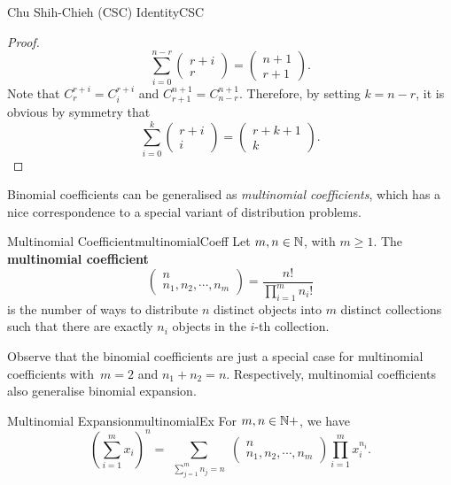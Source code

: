 \documentclass[math]{amznotes}
\theoremstyle{remark}
\newcommand{\0}{\mathbf{0}}
\newcommand{\1}{\mathbf{1}}
\begin{document}
\begin{thmbox}{Chu Shih-Chieh (CSC) Identity}{CSC}
\begin{proof}
        \begin{equation*}
            \sum_{i = 0}^{n - r}\begin{pmatrix}
                r + i \\
                r
            \end{pmatrix} = \begin{pmatrix}
                n + 1 \\
                r + 1
            \end{pmatrix}.
        \end{equation*}
        Note that $C^{r + i}_r = C^{r + i}_i$ and $C^{n + 1}_{r + 1} = C^{n + 1}_{n - r}$. Therefore, by setting $k = n - r$, it is obvious by symmetry that
        \begin{equation*}
            \sum_{i = 0}^{k}\begin{pmatrix}
                r + i \\
                i
            \end{pmatrix} = \begin{pmatrix}
                r + k + 1 \\
                k
            \end{pmatrix}.
        \end{equation*}
    \end{proof}
\end{thmbox}
Binomial coefficients can be generalised as \textit{multinomial coefficients}, which has a nice correspondence to a special variant of distribution problems.
\begin{dfnbox}{Multinomial Coefficient}{multinomialCoeff}
    Let $m, n \in \mathbb{N}$, with $m \geq 1$. The {\color{red} \textbf{multinomial coefficient}}
    \begin{displaymath}
        \begin{pmatrix}
            n \\
            n_1, n_2, \cdots, n_m
        \end{pmatrix} = \frac{n!}{\prod_{i = 1}^{m}n_i!}
    \end{displaymath}
    is the number of ways to distribute $n$ distinct objects into $m$ distinct collections such that there are exactly $n_i$ objects in the $i$-th collection.
\end{dfnbox}
Observe that the binomial coefficients are just a special case for multinomial coefficients with~$m = 2$ and $n_1 + n_2 = n$. Respectively, multinomial coefficients also generalise binomial expansion.
\begin{thmbox}{Multinomial Expansion}{multinomialEx}
    For $m, n \in \mathbb{N}+$, we have
    \begin{equation*}
        \left(\sum_{i = 1}^{m}x_i\right)^n = \sum_{\substack{\sum_{j = 1}^{m}n_j = n}} \begin{pmatrix}
            n \\
            n_1, n_2, \cdots, n_m
        \end{pmatrix}\prod_{i = 1}^{m}x_i^{n_i}.
    \end{equation*}
\end{thmbox}
\end{document}
